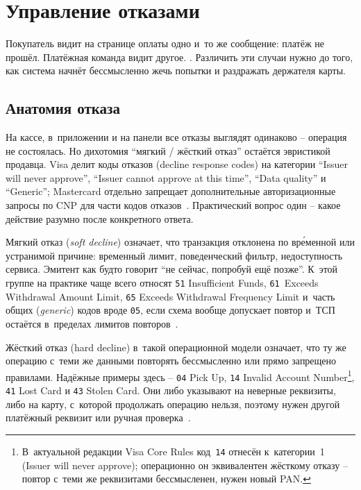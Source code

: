 
\chapter{Управление отказами}\label{ch:decline-management}

Покупатель видит на странице оплаты одно и~то же сообщение: платёж
не прошёл. Платёжная команда видит другое. . Различить эти случаи нужно до того, как система начнёт
бессмысленно жечь попытки и раздражать держателя карты.

\section{Анатомия отказа}\label{sec:decline-anatomy}

На кассе, в~приложении и на панели все отказы выглядят одинаково --
операция не состоялась. Но дихотомия \enquote{мягкий /
жёсткий отказ} остаётся эвристикой продавца. Visa делит
коды отказов (decline response codes) на категории
\enquote{Issuer will never approve}, \enquote{Issuer cannot approve at this
time}, \enquote{Data quality} и \enquote{Generic}; Mastercard
отдельно запрещает дополнительные авторизационные запросы по CNP для части
кодов отказов~\cite{visa-core-rules,mc-tpr}. Практический вопрос
один -- какое действие разумно после конкретного ответа.

Мягкий отказ (\textit{soft decline}) означает, что транзакция отклонена по
вр\'{е}менной или устранимой причине: временный лимит, поведенческий
фильтр, недоступность сервиса. Эмитент как будто говорит
\enquote{не сейчас, попробуй ещё позже}. К~этой группе на практике чаще
всего относят \texttt{51} Insufficient Funds, \texttt{61}~Exceeds
Withdrawal Amount Limit, \texttt{65} Exceeds Withdrawal Frequency
Limit и~часть общих (\textit{generic}) кодов вроде \texttt{05}, если
схема вообще допускает повтор и~ТСП остаётся в~пределах лимитов
повторов~\cite{visa-core-rules}.

Жёсткий отказ (hard decline) в~такой операционной модели означает, что ту
же операцию с~теми же данными повторять бессмысленно или прямо запрещено
правилами. Надёжные примеры здесь -- \texttt{04} Pick Up,
\texttt{14} Invalid Account Number\footnote{В~актуальной редакции
Visa Core Rules код~\texttt{14} отнесён к~категории~1 (Issuer will
never approve); операционно он эквивалентен жёсткому отказу -- повтор
с~теми же реквизитами бессмысленен, нужен новый PAN.}, \texttt{41}
Lost Card и \texttt{43} Stolen Card. Они либо указывают на неверные
реквизиты, либо на карту, с~которой продолжать операцию нельзя, поэтому
нужен другой платёжный реквизит или ручная
проверка~\cite{visa-core-rules,mc-tpr}.

